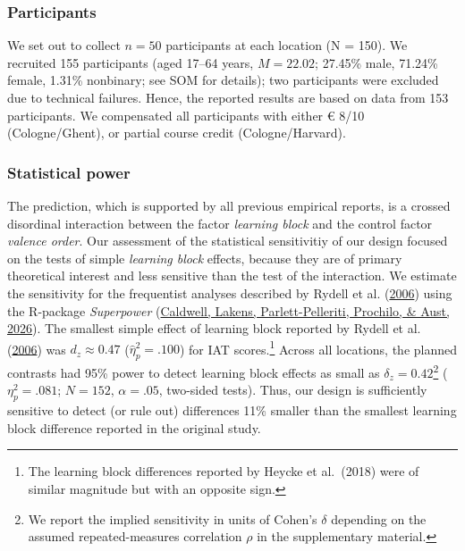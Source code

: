 \documentclass[
  man,floatsintext]{apa6}
\begin{document}
\hypertarget{participants}{%
\subsubsection{Participants}\label{participants}}

We set out to collect \(n = 50\) participants at each location (N = 150).
We recruited 155 participants (aged 17--64 years, \(M = 22.02\); 27.45\% male, 71.24\% female, 1.31\% nonbinary; see SOM for details); two participants were excluded due to technical failures.
Hence, the reported results are based on data from 153 participants.
We compensated all participants with either € 8/10 (Cologne/Ghent), or partial course credit (Cologne/Harvard).

\hypertarget{statistical-power}{%
\subsubsection{Statistical power}\label{statistical-power}}

The prediction, which is supported by all previous empirical reports, is a crossed disordinal interaction between the factor \emph{learning block} and the control factor \emph{valence order}.
Our assessment of the statistical sensitivitiy of our design focused on the tests of simple \emph{learning block} effects, because they are of primary theoretical interest and less sensitive than the test of the interaction.
We estimate the sensitivity for the frequentist analyses described by Rydell et al. (\protect\hyperlink{ref-rydell_two_2006}{2006}) using the R-package \emph{Superpower} (\protect\hyperlink{ref-R-Superpower}{Caldwell, Lakens, Parlett-Pelleriti, Prochilo, \& Aust, 2026}).
The smallest simple effect of learning block reported by Rydell et al. (\protect\hyperlink{ref-rydell_two_2006}{2006}) was \(d_z \approx 0.47\) (\(\hat\eta_p^2 = .100\)) for IAT scores.\footnote{The learning block differences reported by Heycke et al.~(2018) were of similar magnitude but with an opposite sign.}
Across all locations, the planned contrasts had 95\% power to detect learning block effects as small as \(\delta_z = 0.42\)\footnote{We report the implied sensitivity in units of Cohen's \(\delta\) depending on the assumed repeated-measures correlation \(\rho\) in the supplementary material.} (\(\eta_p^2 = .081\); \(N = 152\), \(\alpha = .05\), two-sided tests).
Thus, our design is sufficiently sensitive to detect (or rule out) differences 11\% smaller than the smallest learning block difference reported in the original study.
\end{document}
